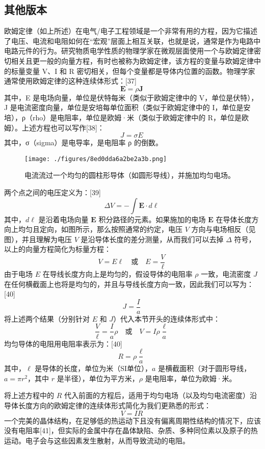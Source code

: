 \subsection{其他版本}  
欧姆定律（如上所述）在电气/电子工程领域是一个非常有用的方程，因为它描述了电压、电流和电阻如何在“宏观”层面上相互关联，也就是说，通常是作为电路中电路元件的行为。研究物质电学性质的物理学家在微观层面使用一个与欧姆定律密切相关且更一般的向量方程，有时也被称为欧姆定律，该方程的变量与欧姆定律中的标量变量 V、I 和 R 密切相关，但每个变量都是导体内位置的函数。物理学家通常使用欧姆定律的这种连续体形式：[37]
\[
\mathbf {E} =\rho \mathbf {J}~
\]
其中，E 是电场向量，单位是伏特每米（类似于欧姆定律中的 V，单位是伏特），J 是电流密度向量，单位是安培每单位面积（类似于欧姆定律中的 I，单位是安培），ρ（rho）是电阻率，单位是欧姆·米（类似于欧姆定律中的 R，单位是欧姆）。上述方程也可以写作[38]：
\[
J = \sigma E~
\]
其中，σ（sigma）是电导率，是电阻率 ρ 的倒数。
\begin{figure}[ht]
\centering
\texttt{[image: ./figures/8ed0dda6a2be2a3b.png]}
\caption{电流流过一个均匀的圆柱形导体（如圆形导线），并施加均匀电场。} \label{fig_OuMu_9}
\end{figure}
两个点之间的电压定义为：[39]
\[
\Delta V = - \int \mathbf{E} \cdot d\boldsymbol{\ell}~
\]
其中，\( d\boldsymbol{\ell} \) 是沿着电场向量 \( \mathbf{E} \) 积分路径的元素。如果施加的电场 \( \mathbf{E} \) 在导体长度方向上均匀且定向，如图所示，那么按照通常的约定，电压 \( V \) 方向与电场相反（见图），并且理解为电压 \( V \) 是沿导体长度的差分测量，从而我们可以去掉 \( \Delta \) 符号，以上的向量方程简化为标量方程：
\[
V = E\ell \quad \text{或} \quad E = \frac{V}{\ell}~
\]
由于电场 \( E \) 在导线长度方向上是均匀的，假设导体的电阻率 \( \rho \) 一致，电流密度 \( J \) 在任何横截面上也将是均匀的，并且与导线长度方向一致，因此我们可以写为：[40]
\[
J = \frac{I}{a}~
\]
将上述两个结果（分别针对 \( E \) 和 \( J \)）代入本节开头的连续体形式中：
\[
\frac{V}{\ell} = \frac{I}{a}\rho \quad \text{或} \quad V = I \rho \frac{\ell}{a}~
\]
均匀导体的电阻用电阻率表示为：[40]
\[
R = \rho \frac{\ell}{a}~
\]
其中，\( \ell \) 是导体的长度，单位为米（SI单位），\( a \) 是横截面积（对于圆形导线，\( a = \pi r^2 \)，其中 \( r \) 是半径），单位为平方米，\( \rho \) 是电阻率，单位为欧姆·米。

将上述方程中的 \( R \) 代入前面的方程后，适用于均匀电场（以及均匀电流密度）沿导体长度方向的欧姆定律的连续体形式简化为我们更熟悉的形式：
\[
V = IR~
\]
一个完美的晶体结构，在足够低的热运动下且没有偏离周期性结构的情况下，应该没有电阻率[41]，但实际的金属中存在晶体缺陷、杂质、多种同位素以及原子的热运动。电子会与这些因素发生散射，从而导致流动的电阻。

